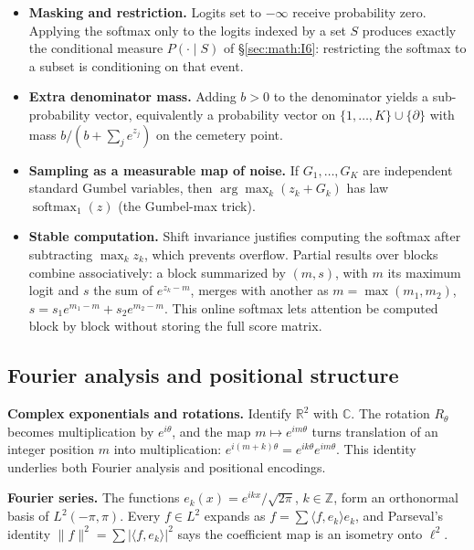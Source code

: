 \begin{itemize}
\tightlist
\item
  \textbf{Masking and restriction.} Logits set to \(-\infty\) receive probability
  zero. Applying the softmax only to the logits indexed by a set \(S\)
  produces exactly the conditional measure \(P(\cdot \mid S)\) of \S\ref{sec:math:I6}:
  restricting the softmax to a subset is conditioning on that event.
\item
  \textbf{Extra denominator mass.} Adding \(b > 0\) to the
  denominator yields a sub-probability vector, equivalently a
  probability vector on \(\{1, \ldots, K\} \cup \{\partial\}\) with mass \(b/(b + \sum_j
  e^{z_j})\) on the cemetery point.
\item
  \textbf{Sampling as a measurable map of noise.} If \(G_{1}, \ldots,
  G_K\) are independent standard Gumbel variables, then \(\arg\max_k (z_k +
  G_k)\) has law \(\operatorname{softmax}_{1}(z)\) (the Gumbel-max trick).
\item
  \textbf{Stable computation.} Shift invariance justifies computing the
  softmax after subtracting \(\max_k z_k\), which prevents overflow.
  Partial results over blocks combine associatively: a block summarized
  by \((m, s)\), with \(m\) its maximum logit and \(s\) the sum of \(e^{z_k - m}\),
  merges with another as \(m = \max(m_{1}, m_{2})\), \(s =
  s_{1}e^{m_{1}-m} + s_{2}e^{m_{2}-m}\). This online
  softmax lets attention be computed block by block without storing the
  full score matrix.
\end{itemize}

\subsection{Fourier analysis and positional
structure}\label{sec:math:I8}

\textbf{Complex exponentials and rotations.} Identify \(\mathbb{R}^{2}\)
with \(\mathbb{C}\). The rotation \(R_\theta\) becomes multiplication by
\(e^{i\theta}\), and the map \(m \mapsto e^{im\theta}\) turns translation of an integer
position \(m\) into multiplication: \(e^{i(m+k)\theta} =
e^{ik\theta}e^{im\theta}\). This identity underlies both Fourier
analysis and positional encodings.

\textbf{Fourier series.} The functions \(e_k(x) = e^{ikx}/\sqrt{2\pi}\), \(k \in
\mathbb{Z}\), form an orthonormal basis of \(L^{2}(-\pi, \pi)\). Every \(f \in
L^{2}\) expands as \(f = \sum \langle f, e_k\rangle e_k\), and Parseval's identity
\(\|f\|^{2} = \sum |\langle f, e_k\rangle|^{2}\) says the coefficient
map is an isometry onto \(\ell^{2}\).

